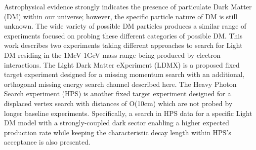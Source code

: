 Astrophysical evidence strongly indicates the presence of particulate Dark Matter (DM) within our universe; however, the specific particle nature of DM is still unknown. The wide variety of possible DM particles produces a similar range of experiments focused on probing these different categories of possible DM. This work describes two experiments taking different approaches to search for Light DM residing in the 1MeV-1GeV mass range being produced by electron interactions. The Light Dark Matter eXperiment (LDMX) is a proposed fixed target experiment designed for a missing momentum search with an additional, orthogonal missing energy search channel described here. The Heavy Photon Search experiment (HPS) is another fixed target experiment designed for a displaced vertex search with distances of O(10cm) which are not probed by longer baseline experiments. Specifically, a search in HPS data for a specific Light DM model with a strongly-coupled dark sector enabling a higher expected production rate while keeping the characteristic decay length within HPS's acceptance is also presented.
